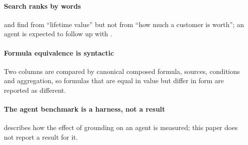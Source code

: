 \paragraph{Search ranks by words}  and  find
 from ``lifetime value'' but not from ``how much a customer is
worth''; an agent is expected to follow up with .

\paragraph{Formula equivalence is syntactic} Two columns are compared by canonical composed
formula, sources, conditions and aggregation, so formulas that are equal in value but differ in
form are reported as different.

\paragraph{The agent benchmark is a harness, not a result}  describes how
the effect of grounding on an agent is measured; this paper does not report a result for it.
